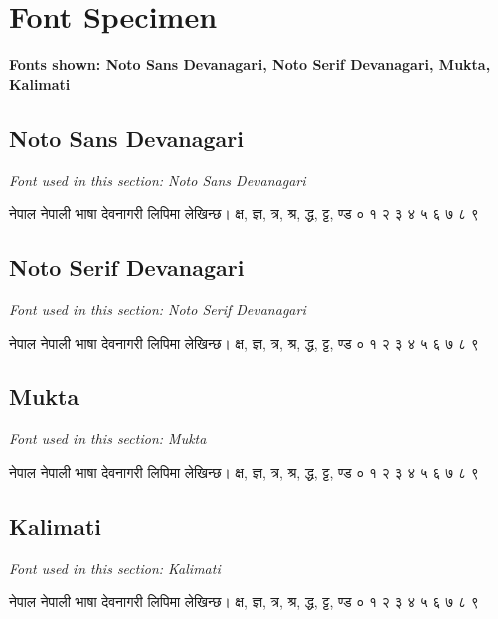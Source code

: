 \documentclass{article}
\begin{document}
\section*{Font Specimen}
\textbf{Fonts shown: Noto Sans Devanagari, Noto Serif Devanagari, Mukta, Kalimati}

\subsection*{Noto Sans Devanagari}
\textit{Font used in this section: Noto Sans Devanagari}
\begin{nepali}
नेपाल नेपाली भाषा देवनागरी लिपिमा लेखिन्छ।
क्ष, ज्ञ, त्र, श्र, द्ध, ट्ट, ण्ड
० १ २ ३ ४ ५ ६ ७ ८ ९
\end{nepali}

\subsection*{Noto Serif Devanagari}
\textit{Font used in this section: Noto Serif Devanagari}
\begin{nepali}
नेपाल नेपाली भाषा देवनागरी लिपिमा लेखिन्छ।
क्ष, ज्ञ, त्र, श्र, द्ध, ट्ट, ण्ड
० १ २ ३ ४ ५ ६ ७ ८ ९
\end{nepali}

\subsection*{Mukta}
\textit{Font used in this section: Mukta}
\begin{nepali}
नेपाल नेपाली भाषा देवनागरी लिपिमा लेखिन्छ।
क्ष, ज्ञ, त्र, श्र, द्ध, ट्ट, ण्ड
० १ २ ३ ४ ५ ६ ७ ८ ९
\end{nepali}

\subsection*{Kalimati}
\textit{Font used in this section: Kalimati}
\begin{nepali}
नेपाल नेपाली भाषा देवनागरी लिपिमा लेखिन्छ।
क्ष, ज्ञ, त्र, श्र, द्ध, ट्ट, ण्ड
० १ २ ३ ४ ५ ६ ७ ८ ९
\end{nepali}
\end{document}
